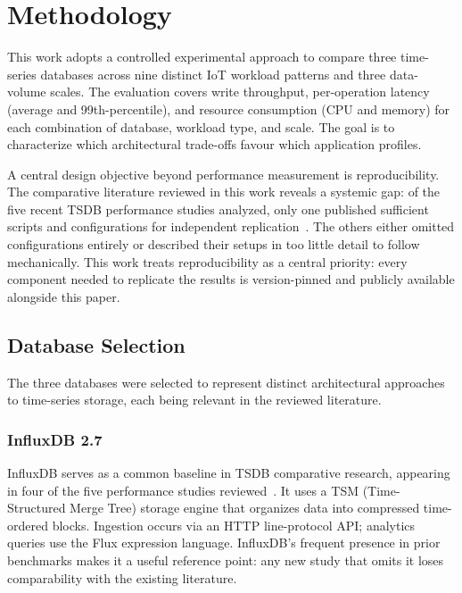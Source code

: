 \section{Methodology}
\label{sec:methodology}

This work adopts a controlled experimental approach to compare three time-series databases
across nine distinct IoT workload patterns and three data-volume scales. The evaluation covers
write throughput, per-operation latency (average and 99th-percentile), and resource consumption
(CPU and memory) for each combination of database, workload type, and scale. The goal is to
characterize which architectural trade-offs favour which application profiles.

A central design objective beyond performance measurement is reproducibility.
The comparative literature reviewed in this work reveals a systemic gap: of the five recent
TSDB performance studies analyzed, only one published sufficient scripts and configurations
for independent replication~\citep{pereira2023mulletbench}. The others either omitted
configurations entirely or described their setups in too little detail to follow mechanically.
This work treats reproducibility as a central priority: every component needed to replicate the results is version-pinned and publicly available
alongside this paper.

\subsection{Database Selection}

The three databases were selected to represent distinct architectural approaches to time-series storage, each being relevant in the reviewed literature.

\subsubsection{InfluxDB 2.7}

InfluxDB serves as a common baseline in TSDB comparative research, appearing in four of the five performance studies reviewed~\citep{naqvi2017influxdb,
shah2022performance,lima2024avaliando,wang2023iotdb}. It uses a TSM (Time-Structured Merge
Tree) storage engine that organizes data into compressed time-ordered blocks. Ingestion
occurs via an HTTP line-protocol API; analytics queries use the Flux expression language.
InfluxDB's frequent presence in prior benchmarks makes it a useful reference point: any new
study that omits it loses comparability with the existing literature.

